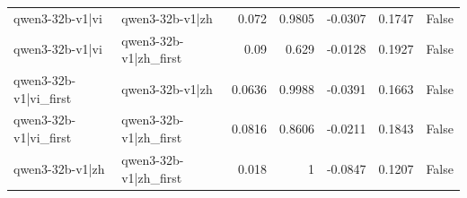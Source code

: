 \begin{table}
\begin{tabular}{l l r r r r l}
qwen3-32b-v1|vi & qwen3-32b-v1|zh & 0.072 & 0.9805 & -0.0307 & 0.1747 & False \\
qwen3-32b-v1|vi & qwen3-32b-v1|zh_first & 0.09 & 0.629 & -0.0128 & 0.1927 & False \\
qwen3-32b-v1|vi_first & qwen3-32b-v1|zh & 0.0636 & 0.9988 & -0.0391 & 0.1663 & False \\
qwen3-32b-v1|vi_first & qwen3-32b-v1|zh_first & 0.0816 & 0.8606 & -0.0211 & 0.1843 & False \\
qwen3-32b-v1|zh & qwen3-32b-v1|zh_first & 0.018 & 1 & -0.0847 & 0.1207 & False \\
\bottomrule
\end{tabular}
\end{table}
